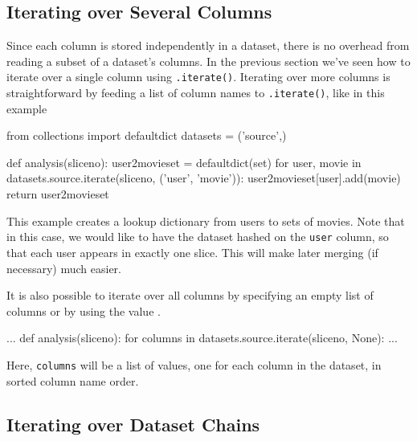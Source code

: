\subsection{Iterating over Several Columns}
Since each column is stored independently in a dataset, there is no
overhead from reading a subset of a dataset's columns.  In the
previous section we've seen how to iterate over a single column using
\texttt{.iterate()}.  Iterating over more columns is straightforward
by feeding a list of column names to \texttt{.iterate()}, like in this
example
\begin{python}
from collections import defaultdict
datasets = ('source',)

def analysis(sliceno):
    user2movieset = defaultdict(set)
    for user, movie in datasets.source.iterate(sliceno, ('user', 'movie')):
        user2movieset[user].add(movie)
    return user2movieset
\end{python}
This example creates a lookup dictionary from users to sets of movies.
Note that in this case, we would like to have the dataset hashed on
the \texttt{user} column, so that each user appears in exactly one slice.
This will make later merging (if necessary) much easier.

It is also possible to iterate over all columns by specifying an empty
list of columns or by using the value \pyNone.
\begin{python}
...
def analysis(sliceno):
    for columns in datasets.source.iterate(sliceno, None):
        ...
\end{python}
Here, \texttt{columns} will be a list of values, one for each column
in the dataset, in sorted column name order.


\subsection{Iterating over Dataset Chains}

